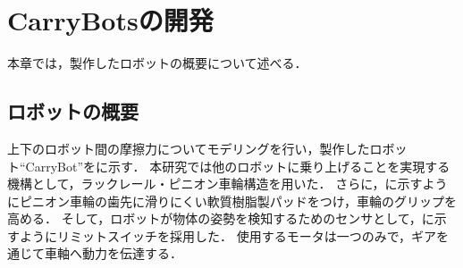 \section{CarryBotsの開発}
本章では，製作したロボットの概要について述べる．

\subsection{ロボットの概要}
上下のロボット間の摩擦力についてモデリングを行い，製作したロボット``CarryBot''をに示す．
本研究では他のロボットに乗り上げることを実現する機構として，ラックレール・ピニオン車輪構造を用いた．
さらに，に示すようにピニオン車輪の歯先に滑りにくい軟質樹脂製パッドをつけ，車輪のグリップを高める．
そして，ロボットが物体の姿勢を検知するためのセンサとして，に示すようにリミットスイッチを採用した．
使用するモータは一つのみで，ギアを通じて車軸へ動力を伝達する．

